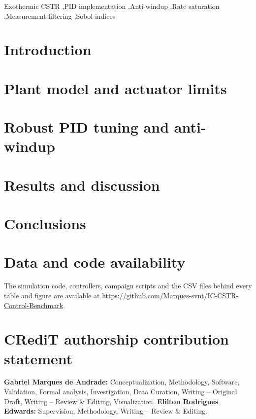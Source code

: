 \documentclass[a4paper,fleqn]{cas-dc}
\begin{document}


\begin{keywords}
Exothermic CSTR \sep PID implementation \sep Anti-windup \sep Rate saturation \sep Measurement filtering \sep Sobol indices
\end{keywords}

\maketitle

\section{Introduction}\label{sec:intro}


\section{Plant model and actuator limits}\label{sec:model}


\section{Robust PID tuning and anti-windup}\label{sec:pid}


\section{Results and discussion}\label{sec:results}


\section{Conclusions}\label{sec:conclusion}


\section*{Data and code availability}
The simulation code, controllers, campaign scripts and the CSV files behind every table and figure are available at \url{https://github.com/Marques-svnt/IC-CSTR-Control-Benchmark}.

\section*{CRediT authorship contribution statement}
\textbf{Gabriel Marques de Andrade:} Conceptualization, Methodology, Software, Validation, Formal analysis, Investigation, Data Curation, Writing -- Original Draft, Writing -- Review \& Editing, Visualization. \textbf{Elilton Rodrigues Edwards:} Supervision, Methodology, Writing -- Review \& Editing.
\end{document}
